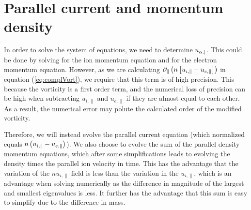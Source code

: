 \section{Parallel current and momentum density}
In order to solve the system of equations, we need to determine $u_{\alpha,|}$.
This could be done by solving for the ion momentum equation and for the electron momentum equation.
However, as we are calculating $\partial_\|\left(n\left[u_{i,\|} - u_{e,\|}\right]\right)$ in equation (\ref{eq:complVort}), we require that this term is of high precision.
This because the vorticity is a first order term, and the numerical loss of precision can be high when subtracting $u_{i,\|}$ and $u_{e,\|}$ if they are almost equal to each other.
As a result, the numerical error may polute the calculated order of the modified vorticity.

Therefore, we will instead evolve the parallel current equation (which normalized equals $n\left(u_{i,\|} - u_{e,\|}\right)$).
We also choose to evolve the sum of the parallel density momentum equations, which after some simplifications leads to evolving the density times the parallel ion velocity in time.
This has the advantage that the variation of the $nu_{i,\|}$ field is less than the variation in the $u_{i,\|}$, which is an advantage when solving numerically as the difference in magnitude of the largest and smallest eigenvalues is less.
It further has the advantage that this sum is easy to simplify due to the difference in mass.

